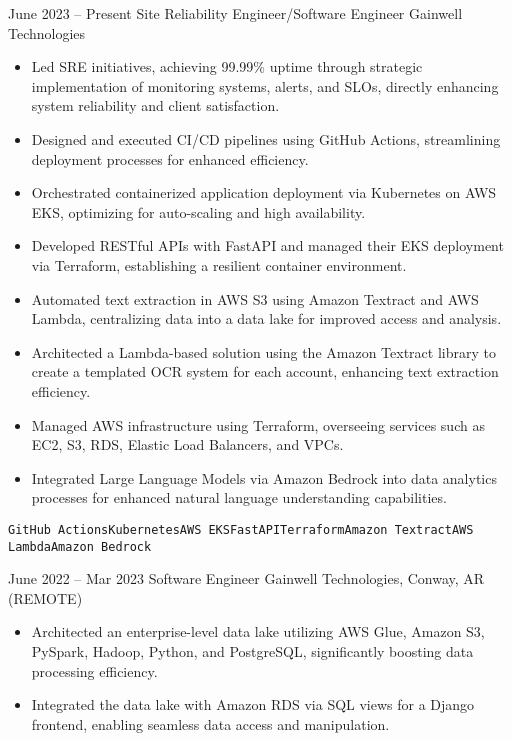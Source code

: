 \documentclass[9pt]{developercv} %
\begin{document}
\begin{entrylist}
    \entry
        { June 2023 -- Present}
        { Site Reliability Engineer/Software Engineer}
        { Gainwell Technologies }
        {
        \begin{itemize}
            \item Led SRE initiatives, achieving 99.99\% uptime through strategic implementation of monitoring systems, alerts, and SLOs, directly enhancing system reliability and client satisfaction.
            \item Designed and executed CI/CD pipelines using GitHub Actions, streamlining deployment processes for enhanced efficiency.
            \item Orchestrated containerized application deployment via Kubernetes on AWS EKS, optimizing for auto-scaling and high availability.
            \item Developed RESTful APIs with FastAPI and managed their EKS deployment via Terraform, establishing a resilient container environment.
            \item Automated text extraction in AWS S3 using Amazon Textract and AWS Lambda, centralizing data into a data lake for improved access and analysis.
            \item Architected a Lambda-based solution using the Amazon Textract library to create a templated OCR system for each account, enhancing text extraction efficiency.
            \item Managed AWS infrastructure using Terraform, overseeing services such as EC2, S3, RDS, Elastic Load Balancers, and VPCs.
            \item Integrated Large Language Models via Amazon Bedrock into data analytics processes for enhanced natural language understanding capabilities.
        \end{itemize}
        \texttt{GitHub Actions}\slashsep\texttt{Kubernetes}\slashsep\texttt{AWS EKS}\slashsep\texttt{FastAPI}\slashsep\texttt{Terraform}\slashsep\texttt{Amazon Textract}\slashsep\texttt{AWS Lambda}\slashsep\texttt{Amazon Bedrock}
        }
    \entry
        { June 2022 -- Mar 2023}
        { Software Engineer}
        { Gainwell Technologies, Conway, AR (REMOTE)}
        {
        \begin{itemize}
            \item Architected an enterprise-level data lake utilizing AWS Glue, Amazon S3, PySpark, Hadoop, Python, and PostgreSQL, significantly boosting data processing efficiency.
            \item Integrated the data lake with Amazon RDS via SQL views for a Django frontend, enabling seamless data access and manipulation.

\end{itemize}}
\end{entrylist}
\end{document}
